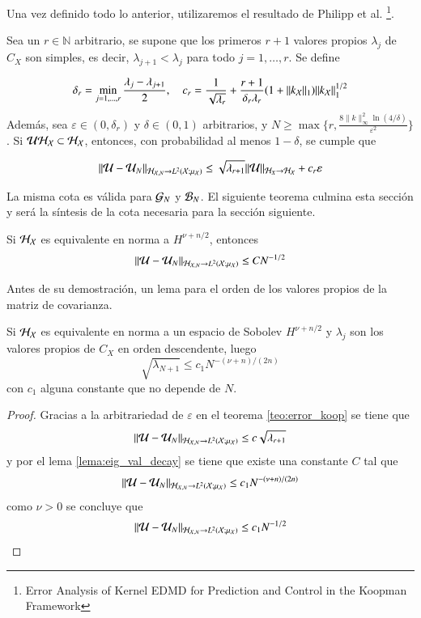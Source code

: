 	Una vez definido todo lo anterior, utilizaremos el resultado de Philipp et al. \cite{Philipp2024ErrorOperator}\footnote{Error Analysis of Kernel EDMD for Prediction and Control in the Koopman Framework}.
	\begin{teo}
		Sea un \( r \in \mathbb{N} \) arbitrario, se supone que los primeros \( r + 1 \) valores propios \( \lambda_j \) de \( C_X \) son simples, es decir, \( \lambda_{j+1} < \lambda_j \) para todo \( j = 1, \ldots, r \). Se define
		
		\[
		\delta_r = \min_{j=1, \ldots, r} \frac{\lambda_j - \lambda_{j+1}}{2}, \quad c_r = \frac{1}{\sqrt{\lambda_r}} + \frac{r + 1}{\delta_r \lambda_r} (1 + \|k_{\mathcal{X}}\|_{1}) \|k_{\mathcal{X}} \|^{1/2}_{1}
		\]
		Además, sea \( \varepsilon \in (0, \delta_r) \) y \( \delta \in (0, 1) \) arbitrarios, y \( N \geq \max\{r, \frac{8\|k\|^2_\infty \ln(4/\delta)}{\varepsilon^2}\} \). Si $\mathcal{U} \mathcal{H}_{\mathcal{X}} \subset \mathcal{H}_{\mathcal{X}}$, entonces, con probabilidad al menos \( 1 - \delta \), se cumple que
		
		\[
		\|\mathcal{U} - \mathcal{U}_N \|_{\mathcal{H}_{\mathcal{X}, N} \to L^2(\mathcal{X}; \mu_{\mathcal{X}})} \leq \sqrt{\lambda_{r+1}} \|\mathcal{U} \|_{\mathcal{H}_{X} \to \mathcal{H_{\mathcal{X}}}} + c_r \varepsilon
		\]
		\label{teo:error_koop}
	\end{teo}
	La misma cota es válida para $\mathcal{G}_N$ y $\mathcal{B}_N$. El siguiente teorema culmina esta sección y será la síntesis de la cota necesaria para la sección siguiente.
	\begin{teo}
		Si $\mathcal{H}_{\mathcal{X}}$ es equivalente en norma a $H^{\nu + n/2}$, entonces 
		\[
		\|\mathcal{U} - \mathcal{U}_N \|_{\mathcal{H}_{\mathcal{X}, N} \to L^2(\mathcal{X}; \mu_{\mathcal{X}})} \leq C N^{-1/2}
		\]
		\label{teo:error_koop_sqrt_N}
	\end{teo}
	Antes de su demostración, un lema para el orden de los valores propios de la matriz de covarianza.
	\begin{lema}
		Si $\mathcal{H}_{\mathcal{X}}$ es equivalente en norma a un espacio de Sobolev $H^{\nu + n/2}$ y $\lambda_j$ son los valores propios de $C_X$ en orden descendente, luego
	\begin{equation*}
		\sqrt{\lambda_{N+1}} \leq c_1 N^{-(\nu + n)/(2n)}
	\end{equation*}
	con $c_1$ alguna constante que no depende de $N$.
	\label{lema:eig_val_decay}
	\end{lema}
	\begin{proof}
		Gracias a la arbitrariedad de $\varepsilon$ en el teorema \ref{teo:error_koop} se tiene que
		\[
		\|\mathcal{U} - \mathcal{U}_N \|_{\mathcal{H}_{\mathcal{X}, N} \to L^2(\mathcal{X}; \mu_{\mathcal{X}})} \leq c\sqrt{\lambda_{r+1}} 
		\]
		y por el lema \ref{lema:eig_val_decay} se tiene que existe una constante $C$ tal que
		\begin{equation*}
			\|\mathcal{U} - \mathcal{U}_N \|_{\mathcal{H}_{\mathcal{X}, N} \to L^2(\mathcal{X}; \mu_{\mathcal{X}})} \leq c_1 N^{-(\nu + n)/(2n)}
		\end{equation*}
		como $\nu > 0$ se concluye que
		\begin{equation*}
			\|\mathcal{U} - \mathcal{U}_N \|_{\mathcal{H}_{\mathcal{X}, N} \to L^2(\mathcal{X}; \mu_{\mathcal{X}})} \leq c_1 N^{-1/2}\\
		\end{equation*}
	\end{proof}

